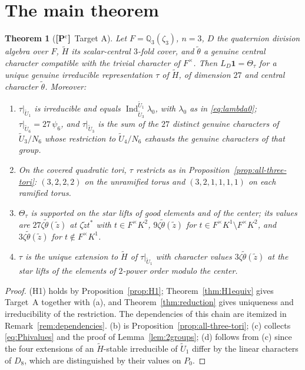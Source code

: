 \documentclass[11pt]{article}
\newcommand{\Q}{\mathbb Q}
\newcommand{\Ind}{\operatorname{Ind}}
\newcommand{\tH}{\widetilde H}
\newcommand{\tU}{\widetilde U}
\newcommand{\tth}{\widetilde\theta}
\newcommand{\Pctag}{\textnormal{\textbf{[P$^{\mathrm c}$]}}}
\theoremstyle{plain}
\newtheorem{theorem}{Theorem}[section]
\theoremstyle{definition}
\begin{document}
\section{The main theorem}\label{sec:maintheorem}
\begin{theorem}[\Pctag\ Target A]\label{thm:main-targetA}
Let $F=\Q_3(\zeta_3)$, $n=3$, $D$ the quaternion division algebra over
$F$, $\tH$ its scalar-central $3$-fold cover, and $\tth$ a genuine
central character compatible with the trivial character of $F^\times$.
Then $L_D\mathbf1=\Theta_\tau$ for a unique genuine irreducible
representation $\tau$ of $\tH$, of dimension $27$ and central character
$\tth$.  Moreover:
\begin{enumerate}[label=(\alph*)]
\item $\tau|_{\tU_1}$ is irreducible and equals
$\Ind_{\tU_3}^{\tU_1}\lambda_0$, with $\lambda_0$ as in \eqref{eq:lambda0};
$\tau|_{\tU_6}=27\,\psi_6$, and $\tau|_{\tU_3}$ is the sum of the $27$
distinct genuine characters of $\tU_3/N_6$ whose restriction to
$\tU_4/N_6$ exhausts the genuine characters of that group.
\item On the covered quadratic tori, $\tau$ restricts as in
Proposition~\ref{prop:all-three-tori}: $(3,2,2,2)$ on the unramified
torus and $(3,2,1,1,1,1)$ on each ramified torus.
\item $\Theta_\tau$ is supported on the star lifts of good elements and
of the center; its values are $27\zeta\tth(\tilde z)$ at
$\zeta\tilde zt^*$ with $t\in F^\times K^2$, $9\zeta\tth(\tilde z)$ for
$t\in F^\times K^1\setminus F^\times K^2$, and $3\zeta\tth(\tilde z)$ for
$t\notin F^\times K^1$.
\item $\tau$ is the unique extension to $\tH$ of $\tau|_{\tU_1}$ with
character values $3\zeta\tth(\tilde z)$ at the star lifts of the elements
of $2$-power order modulo the center.
\end{enumerate}
\end{theorem}
\begin{proof}
(H1) holds by Proposition~\ref{prop:H1}; Theorem~\ref{thm:H1equiv}
gives Target~A together with (a), and Theorem~\ref{thm:reduction} gives
uniqueness and irreducibility of the restriction.  The dependencies of
this chain are itemized in Remark~\ref{rem:dependencies}.  (b) is
Proposition~\ref{prop:all-three-tori}; (c) collects
\eqref{eq:Phivalues} and the proof of Lemma~\ref{lem:2groups}; (d)
follows from (c) since the four extensions of an $\tH$-stable
irreducible of $\tU_1$ differ by the linear characters of $D_8$, which
are distinguished by their values on $P_0$.
\end{proof}
\end{document}
